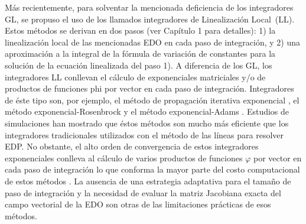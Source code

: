 Más recientemente, para solventar la mencionada deficiencia de los integradores GL, se propuso el uso de los llamados integradores de Linealización Local~(LL). Estos métodos se derivan en dos pasos (ver Capítulo 1 para detalles): 1) la linealización local de las mencionadas EDO en cada paso de integración, y 2) una aproximación a la integral de la fórmula de variación de constantes para la solución de la ecuación linealizada del paso 1). A diferencia de los GL, los integradores LL conllevan el cálculo de exponenciales matriciales y/o de productos de funciones phi por vector en cada paso de integración. Integradores de éste tipo son, por ejemplo, el método de propagación iterativa exponencial \cite{tokman2006efficient}, el método exponencial-Rosenbrock \cite{hochbruck2009exponential} y el método exponencial-Adams \cite{hochbruck2011exponential}. Estudios de simulaciones han mostrado que éstos métodos son mucho más eficiente que los integradores tradicionales utilizados con el método de las líneas para resolver EDP. No obstante, el alto orden de convergencia de estos integradores exponenciales conlleva al cálculo de varios productos de funciones $\varphi$ por vector en cada paso de integración lo que conforma la mayor parte  del costo computacional de estos métodos \cite{naranjo2021locally}. La ausencia de una estrategia adaptativa para el tamaño de paso de integración y la necesidad de evaluar la matriz Jacobiana exacta del campo vectorial de la EDO son otras de las limitaciones prácticas de esos métodos.

